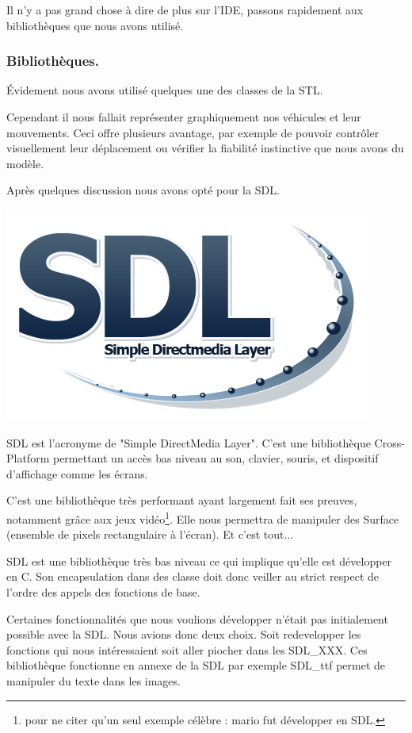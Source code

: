 \documentclass[a4paper,11pt]{article}
\begin{document}
Il n'y a pas grand chose à dire de plus sur l'IDE, passons rapidement aux bibliothèques que nous avons utilisé. 

\subsubsection{Bibliothèques.}

Évidement nous avons utilisé quelques une des classes de la STL.

Cependant il nous fallait représenter graphiquement nos véhicules et leur mouvements. Ceci offre plusieurs avantage, par exemple de pouvoir contrôler visuellement leur déplacement ou vérifier la fiabilité instinctive que nous avons du modèle.

Après quelques discussion nous avons opté pour la SDL.

\includegraphics[scale=0.25]{SDL_logo.PNG}

SDL est l'acronyme de "Simple DirectMedia Layer". C'est une bibliothèque Cross-Platform permettant un accès bas niveau au son, clavier, souris, et dispositif d'affichage comme les écrans.

C'est une bibliothèque très performant ayant largement fait ses preuves, notamment grâce aux jeux vidéo\footnote{pour ne citer qu'un seul exemple célèbre : mario fut développer en SDL.}. Elle nous permettra de manipuler des Surface (ensemble de pixels rectangulaire à l'écran). Et c'est tout...

SDL est une bibliothèque très bas niveau ce qui implique qu'elle est développer en C. Son encapsulation dans des classe doit donc veiller au strict respect de l'ordre des appels des fonctions de base.

Certaines fonctionnalités que nous voulions développer n'était pas initialement possible avec la SDL. Nous avions donc deux choix. Soit redevelopper les fonctions qui nous intéressaient soit aller piocher dans les SDL\_XXX. Ces bibliothèque fonctionne en annexe de la SDL par exemple SDL\_ttf permet de manipuler du texte dans les images.
\end{document}
